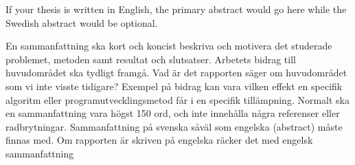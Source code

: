 If your thesis is written in English, the primary abstract would go here while the Swedish abstract would be optional.

En sammanfattning ska kort och koncist beskriva och motivera det studerade problemet,
metoden samt resultat och slutsatser. Arbetets bidrag till huvudområdet ska tydligt framgå.
Vad är det rapporten säger om huvudområdet som vi inte visste tidigare? Exempel på
bidrag kan vara vilken effekt en specifik algoritm eller programutvecklingsmetod får i en
specifik tillämpning.
Normalt ska en sammanfattning vara högst 150 ord, och inte innehålla några referenser
eller radbrytningar.
Sammanfattning på svenska såväl som engelska (abstract) måste finnas med. Om
rapporten är skriven på engelska räcker det med engelsk sammanfattning 
